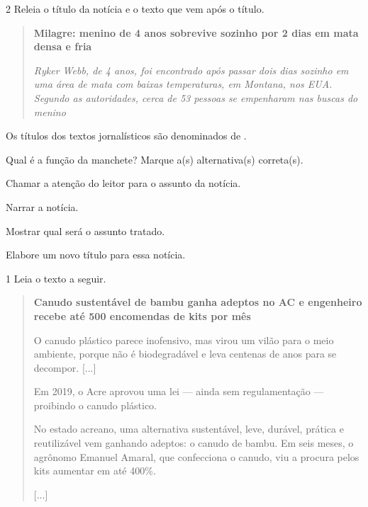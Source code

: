 \num{2} Releia o título da notícia e o texto que vem após o título.

\begin{quote}
\textbf{Milagre: menino de 4 anos sobrevive sozinho por 2 dias em mata densa e fria}

\emph{Ryker Webb, de 4 anos, foi encontrado após passar dois dias
sozinho em uma área de mata com baixas temperaturas, em Montana, nos
EUA. Segundo as autoridades, cerca de 53 pessoas se empenharam nas
buscas do menino}
\end{quote}

\begin{escolha}
\item Os títulos dos textos jornalísticos são denominados de .

\item Qual é a função da manchete? Marque a(s) alternativa(s) correta(s).

\begin{boxlist}
 Chamar a atenção do leitor para o assunto da notícia.

 Narrar a notícia.

 Mostrar qual será o assunto tratado.
\end{boxlist}

\item Elabore um novo título para essa notícia.

\end{escolha}


\num{1} Leia o texto a seguir.

\begin{quote}
\textbf{Canudo sustentável de bambu ganha adeptos no AC e engenheiro
recebe até 500 encomendas de kits por mês}

O canudo plástico parece inofensivo, mas virou um vilão para o meio
ambiente, porque não é biodegradável e leva centenas de anos para se
decompor. {[}...{]}

Em 2019, o Acre aprovou uma lei --- ainda sem regulamentação ---
proibindo o canudo plástico.

No estado acreano, uma alternativa sustentável, leve, durável, prática e
reutilizável vem ganhando adeptos: o canudo de bambu. Em seis meses, o
agrônomo Emanuel Amaral, que confecciona o canudo, viu a procura pelos
kits aumentar em até 400\%.

{[}...{]}

\end{quote}

